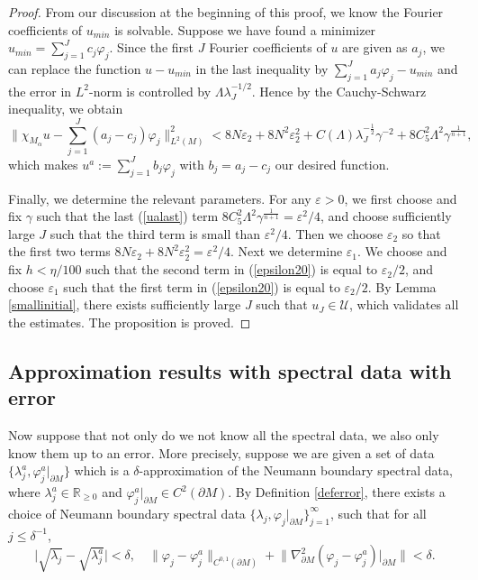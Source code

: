 \documentclass[11pt,letterpaper]{amsart}
\numberwithin{equation}{section}
\theoremstyle{definition}
\theoremstyle{plain}
\theoremstyle{definition}
\theoremstyle{plain}
\theoremstyle{definition}
\theoremstyle{plain}
\begin{document}
\begin{proof}
From our discussion at the beginning of this proof, we know the Fourier coefficients of $u_{min}$ is solvable. Suppose we have found a minimizer $u_{min}=\sum_{j=1}^{J} c_j \varphi_j$. Since the first $J$ Fourier coefficients of $u$ are given as $a_j$, we can replace the function $u-u_{min}$ in the last inequality by $\sum_{j=1}^J a_j \varphi_j-u_{min}$ and the error in $L^2$-norm is controlled by $\Lambda\lambda_{J}^{-1/2}$. Hence by the Cauchy-Schwarz inequality, we obtain
\begin{equation}\label{ualast}
\big\|\chi_{M_{\alpha}}u-\sum_{j=1}^{J}(a_j-c_j)\varphi_j \big\|^2_{L^2(M)} < 8N\varepsilon_2+8N^2\varepsilon_2^2 +C(\Lambda) \lambda_{J}^{-\frac{1}{2}}\gamma^{-2}+ 8C_5^2\Lambda^2\gamma^{\frac{1}{n+1}},
\end{equation}
which makes $u^a :=\sum_{j=1}^{J} b_j \varphi_j$ with $b_j=a_j-c_j$ our desired function. 

Finally, we determine the relevant parameters. For any $\varepsilon>0$, we first choose and fix $\gamma$ such that the last (\ref{ualast}) term $8C_5^2\Lambda^2\gamma^{\frac{1}{n+1}}= \varepsilon^2/4$, and choose sufficiently large $J$ such that the third term is small than $\varepsilon^2/4$. Then we choose $\varepsilon_2$ so that the first two terms $8N\varepsilon_2+8N^2\varepsilon_2^2=\varepsilon^2/4$. Next we determine $\varepsilon_1$. We choose and fix $h<\eta/100$ such that the second term in (\ref{epsilon20}) is equal to $\varepsilon_2/2$, and choose $\varepsilon_1$ such that the first term in (\ref{epsilon20}) is equal to $\varepsilon_2/2$. By Lemma \ref{smallinitial}, there exists sufficiently large $J$ such that $u_{J}\in \mathcal{U}$, which validates all the estimates. The proposition is proved.
\end{proof}

\subsection{Approximation results with spectral data with error} \hfill

\smallskip
Now suppose that not only do we not know all the spectral data, we also only know them up to an error. More precisely, suppose we are given a set of data $\{\lambda^a_j,\varphi^a_j|_{\partial M}\}$ which is a $\delta$-approximation of the Neumann boundary spectral data, where $\lambda_j^a\in \mathbb{R}_{\geqslant 0}$ and $\varphi_j^a|_{\partial M}\in C^2(\partial M)$. By Definition \ref{deferror}, there exists a choice of Neumann boundary spectral data $\{\lambda_j,\varphi_j|_{\partial M}\}_{j=1}^{\infty}$, such that for all $j\leqslant \delta^{-1}$,
\begin{equation}\label{error-condition}
\big|\sqrt{\lambda_j}-\sqrt{\lambda_j^a}\big|<\delta,\quad \|\varphi_j - \varphi_j^a \|_{C^{0,1}(\partial M)}+ \big\|\nabla_{\partial M}^2 (\varphi_j- \varphi_j^a)|_{\partial M} \big\|< \delta.
\end{equation} 
\end{document}
